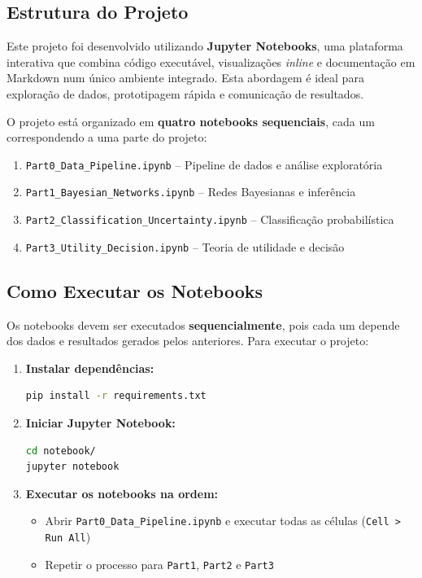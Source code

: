 \documentclass[12pt, a4paper]{article}
\begin{document}
\subsection{Estrutura do Projeto}

Este projeto foi desenvolvido utilizando \textbf{Jupyter Notebooks}, uma plataforma interativa que combina código executável, visualizações \textit{inline} e documentação em Markdown num único ambiente integrado. Esta abordagem é ideal para exploração de dados, prototipagem rápida e comunicação de resultados.

O projeto está organizado em \textbf{quatro notebooks sequenciais}, cada um correspondendo a uma parte do projeto:

\begin{enumerate}
  \item \texttt{Part0\_Data\_Pipeline.ipynb} -- Pipeline de dados e análise exploratória
  \item \texttt{Part1\_Bayesian\_Networks.ipynb} -- Redes Bayesianas e inferência
  \item \texttt{Part2\_Classification\_Uncertainty.ipynb} -- Classificação probabilística
  \item \texttt{Part3\_Utility\_Decision.ipynb} -- Teoria de utilidade e decisão
\end{enumerate}

\subsection{Como Executar os Notebooks}

Os notebooks devem ser executados \textbf{sequencialmente}, pois cada um depende dos dados e resultados gerados pelos anteriores. Para executar o projeto:

\begin{enumerate}
  \item \textbf{Instalar dependências:}
  \begin{lstlisting}[language=bash]
pip install -r requirements.txt
  \end{lstlisting}

  \item \textbf{Iniciar Jupyter Notebook:}
  \begin{lstlisting}[language=bash]
cd notebook/
jupyter notebook
  \end{lstlisting}

  \item \textbf{Executar os notebooks na ordem:}
  \begin{itemize}
    \item Abrir \texttt{Part0\_Data\_Pipeline.ipynb} e executar todas as células (\texttt{Cell > Run All})
    \item Repetir o processo para \texttt{Part1}, \texttt{Part2} e \texttt{Part3}
  \end{itemize}
\end{enumerate}
\end{document}

